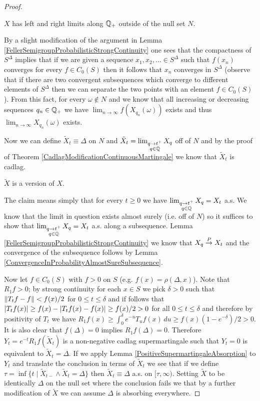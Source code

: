 \begin{proof}
\begin{clm} $X$ has left and right limits along $\mathbb{Q}_+$ outside of the null set $N$.
\end{clm}
By a slight modification of the argument in Lemma \ref{FellerSemigroupProbabilisticStrongContinuity} one sees that the compactness of $S^\Delta$ implies that if we are given
a sequence $x_1, x_2, \dotsc \in S^\Delta$ such that $f(x_n)$ converges for every $f \in C_0(S)$ then it follows that $x_n$ converges in $S^\Delta$ (observe that if there are two convergent subsequences which converge to different elements of $S^\Delta$ then we can separate the two points with an element $f \in C_0(S)$).  From this fact, for every $\omega \notin N$ and we know that all increasing or decreasing sequences $q_n \in \mathbb{Q}_+$ we have $\lim_{n \to \infty} f(X_{q_n}(\omega))$ exists and thus $\lim_{n \to \infty} X_{q_n}(\omega)$ exists.

Now we can define $\tilde{X}_t \equiv \Delta$ on $N$ and $\tilde{X}_t = \lim_{\substack{q \to t^+ \\ q \in \mathbb{Q}}} X_q$ off of $N$ and by the proof of Theorem \ref{CadlagModificationContinuousMartingale} we know that $\tilde{X}_t$ is cadlag.  
\begin{clm} $\tilde{X}$ is a version of $X$.
\end{clm}
The claim means simply that for every $t \geq 0$ we have $\lim_{\substack{q \to t^+ \\ q \in \mathbb{Q}}} X_q =X_t$ a.s. We know that the limit in question exists almost surely (i.e. off of $N$) so it suffices to show that $\lim_{\substack{q \to t^+ \\ q \in \mathbb{Q}}} X_q =X_t$ a.s. along a subsequence.  Lemma \ref{FellerSemigroupProbabilisticStrongContinuity} we know that $X_q \overset{P}\to X_t$ and the convergence of the subsequence follows by Lemma \ref{ConvergenceInProbabilityAlmostSureSubsequence}.

Now let $f \in C_0(S)$ with $f > 0$ on $S$ (e.g. $f(x) = \rho(\Delta, x)$).  Note that $R_1 f > 0$; by strong continuity for each $x \in S$ we pick $\delta>0$ such that $\lVert T_t f - f \rVert < f(x)/2$ for $0 \leq t \leq \delta$ and if follows that $\left \vert T_t f(x) \right \vert \geq  f(x) - \left \vert T_tf(x) - f(x) \right \vert  \geq f(x)/2 > 0$ for all $0  \leq t \leq \delta$ and therefore by positivity of $T_t$ we have $R_1 f (x) \geq \int_0^\delta e^{-u} T_u f(x) \, du \geq f(x)(1-e^{-\delta})/2 > 0$.  It is also clear that $f(\Delta) = 0$ implies $R_1 f(\Delta) = 0$.  Therefore $Y_t = e^{-t} R_1 f(\tilde{X}_t)$ is a non-negative cadlag supermartingale such that $Y_t = 0$ is equivalent to $\tilde{X}_t = \Delta$.  If we apply Lemma \ref{PositiveSupermartingaleAbsorption} to $Y_t$ and translate the conclusion in terms of $\tilde{X}_t$ we see that if we define $\tau = \inf \lbrace t \mid \tilde{X}_{t-} \wedge \tilde{X}_t =\Delta \rbrace$ then $\tilde{X}_t \equiv \Delta$ a.s. on $[\tau, \infty)$.  Setting $\tilde{X}$ to be identically $\Delta$ on the null set where the conclusion fails we that by a further modification of $\tilde{X}$ we can assume $\Delta$ is absorbing everywhere.


\end{proof}
